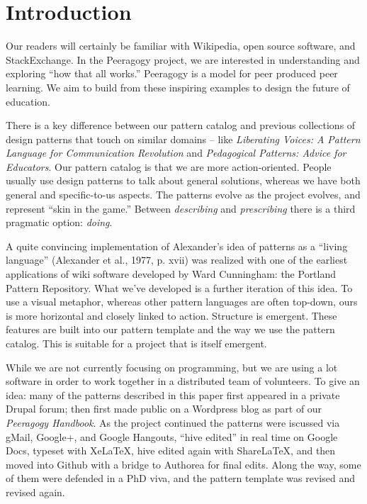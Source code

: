 \section{Introduction}

Our readers will certainly be familiar with Wikipedia, open source software, and StackExchange.  In the Peeragogy project, we are interested in understanding and exploring ``how that all works.''   Peeragogy is a model for peer produced peer learning.  We aim to build from these inspiring examples to design the future of education. 

There is a key difference between our pattern catalog and previous collections of design patterns that touch on similar domains -- like \emph{Liberating Voices: A Pattern Language for Communication Revolution} and \emph{Pedagogical Patterns: Advice for Educators}.  Our pattern catalog is that we are more action-oriented.  People usually use design patterns to talk about general solutions, whereas we have both general and specific-to-us aspects. The patterns evolve as the project evolves, and represent ``skin in the game.''   Between \emph{describing} and \emph{prescribing} there is a third pragmatic option: \emph{doing}.  

A quite convincing implementation of Alexander’s idea of patterns as a “living language” (Alexander et
al., 1977, p. xvii) was realized with one of the earliest applications of wiki
software developed by Ward Cunningham: the Portland Pattern Repository.
What we've developed is a further iteration of this idea. To use a visual metaphor, whereas other pattern languages are often top-down, ours is more horizontal and closely linked to action.  Structure is emergent.  These features are built into our pattern template and the way we use the pattern catalog.  This is suitable for a project
that is itself emergent.

While we are not currently focusing on programming, but we are using a lot software in order to work together in a distributed team of volunteers.  To give an idea: many of the patterns described in this paper first appeared in a private Drupal forum; then first made public on a Wordpress blog as part of our \emph{Peeragogy Handbook}.  As the project continued the patterns were iscussed via gMail, Google+, and Google Hangouts, ``hive edited'' in real time on Google Docs, typeset with XeLaTeX, hive edited again with ShareLaTeX, and then moved into Github with a bridge to Authorea for final edits. Along the way, some of them were defended in a PhD viva, and the pattern template was revised and revised again. 

